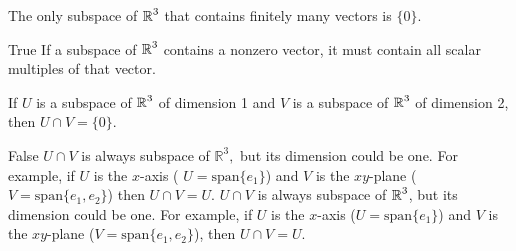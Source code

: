 \documentclass{ximera}
\begin{document}
\begin{exercise}  \label{A5.6.8}
The only subspace of $\mbox{$\Bbb{R}$}^3$ that contains finitely many vectors is $\{ 0 \}$.
\begin{solution}
\ans True
\soln If a subspace of $\mbox{$\Bbb{R}$}^3$ contains a nonzero vector, it must contain all scalar multiples of that vector.
\end{solution}
\end{exercise}

\begin{exercise}  \label{A5.6.9}
If $U$ is a subspace of $\mbox{$\Bbb{R}$}^3$ of dimension 1 and $V$ is a subspace of $\mbox{$\Bbb{R}$}^3$ of dimension 2, then $U\cap V=\{0\}$.
\begin{solution}
\ans False 
\soln $U\cap V$ is always subspace of $\mathbb{R}^3,$ but its dimension could be one. For example, if $U$ is the $x$-axis ( $U=\text{span}\{e_1\}$) and $V$ is the $xy$-plane ($V=\text{span}\{e_1,e_2\}$) then $U\cap V=U.$
$U\cap V$ is always subspace of $\mbox{$\Bbb{R}$}^3$, but its dimension could be one. For example, if $U$ is the $x$-axis ($U=\text{span}\{e_1\}$) and $V$ is the $xy$-plane ($V=\text{span}\{e_1,e_2\}$), then $U\cap V=U$.
\end{solution}
\end{exercise}
\end{document}
